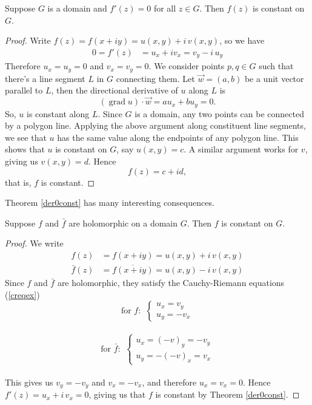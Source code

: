 \begin{theorem}\label{der0const}
Suppose $G$ is a domain and $f'(z) = 0$ for all $z \in G$. Then $f(z)$ is constant on $G$.
\end{theorem}
\begin{proof}
Write $f(z) = f(x + iy) = u(x,y) + i\,v(x,y)$, so we have
\begin{align*}
0 = f'(z) &= u_x + iv_x = v_y - i\,u_y
\end{align*}
Therefore $u_x = u_y = 0$ and $v_x = v_y = 0$. We consider points $p,q \in G$ such that there's a line segment $L$ in $G$ connecting them. Let $\vec{w} = (a,b)$ be a unit vector parallel to $L$, then the directional derivative of $u$ along $L$ is
\[(\operatorname{grad}u)\cdot\vec{w} = au_x + bu_y = 0.\]
So, $u$ is constant along $L$. Since $G$ is a domain, any two points can be connected by a polygon line. Applying the above argument along constituent line segments, we see that $u$ has the same value along the endpoints of any polygon line. This shows that $u$ is constant on $G$, say $u(x,y) = c$. A similar argument works for $v$, giving us $v(x,y) = d$. Hence
\[f(z) = c + id,\]
that is, $f$ is constant.
\end{proof}

\medskip

Theorem \ref{der0const} has many interesting consequences.
\begin{proposition}\label{conjholconst}
Suppose $f$ and $\bar{f}$ are holomorphic on a domain $G$. Then $f$ is constant on $G$.
\end{proposition}
\begin{proof}
We write
\begin{align*}
f(z) &= f(x + iy) = u(x,y) + i\,v(x,y)\\[0.5em]
\bar{f}(z) &= \overline{f(x + iy)} = u(x,y) - i\,v(x,y)
\end{align*}
Since $f$ and $\bar{f}$ are holomorphic, they satisfy the Cauchy-Riemann equations (\ref{creqex})
\[\text{for $f$: }\ \begin{cases}u_x = v_y\\ u_y = -v_x \end{cases}\]\\[-0.5em]
\[\text{for $\bar{f}$: }\ \begin{cases}u_x = (-v)_y = -v_y\\ u_y = -(-v)_x = v_x \end{cases}\]\\
This gives us $v_y = -v_y$ and $v_x = -v_x$, and therefore $u_x = v_x = 0$. Hence $f'(z) = u_x + i\,v_x = 0$, giving us that $f$ is constant by Theorem \ref{der0const}.
\end{proof}


